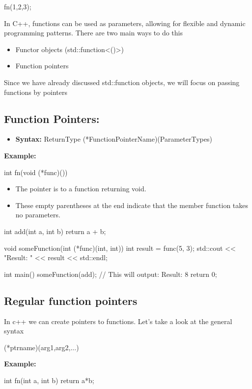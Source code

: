 \documentclass{report}
\begin{document}
\begin{concept}
\begin{cppcode}
fn({1,2,3});
    \end{cppcode}


    \pagebreak
    \begin{concept}
       In C++, functions can be used as parameters, allowing for flexible and dynamic programming patterns. There are two main ways to do this 
       \begin{itemize}
           \item Functor objects (std::function<()>)
            \item Function pointers
       \end{itemize}
    \end{concept}
    \bigbreak \noindent 
    Since we have already discussed std::function objects, we will focus on passing functions by pointers
    \bigbreak \noindent 
    \subsection{Function Pointers:}
    \bigbreak \noindent 
    \begin{itemize}
        \item \textbf{Syntax:} ReturnType (*FunctionPointerName)(ParameterTypes)
    \end{itemize}
    \bigbreak \noindent 
    \textbf{Example:}
    \bigbreak \noindent 
    \begin{cppcode}
    int fn(void (*func)())
    \end{cppcode}
    \bigbreak \noindent 
    \begin{itemize}
        \item The pointer is to a function returning void.
        \item These empty parentheses at the end indicate that the member function takes no parameters.
    \end{itemize}
    \bigbreak \noindent 
    \begin{cppcode}
int add(int a, int b) {
    return a + b;
}

void someFunction(int (*func)(int, int)) {
    int result = func(5, 3);
    std::cout << "Result: " << result << std::endl;
}

int main() {
    someFunction(add);  // This will output: Result: 8
    return 0;
}
    \end{cppcode}
    \pagebreak 
    \subsection{Regular function pointers}
    In c++ we can create pointers to functions. Let's take a look at the general syntax
    \bigbreak \noindent 
    \begin{cppcode}
         (*ptrname)(arg1,arg2,...)
    \end{cppcode}
    \bigbreak \noindent 
    \textbf{Example:}
    \bigbreak \noindent 
    \begin{cppcode}
        int fn(int a, int b) {
            return a*b;
        }


\end{cppcode}
\end{concept}
\end{document}

